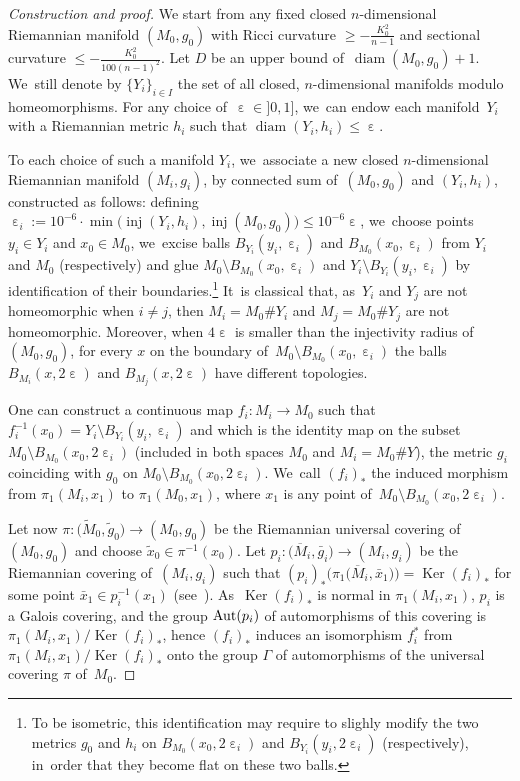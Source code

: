 \documentclass[pdftex]{sigma}
\numberwithin{equation}{section}
\newcommand{\f}{\rightarrow}
\newcommand{\Ker}{\operatorname{Ker}}
\newcommand{\diam}{\operatorname{diam}}
\newcommand{\inj}{\operatorname{inj}}
\newcommand{\e}{\operatorname{\varepsilon}}
\begin{document}
\begin{proof}[Construction and proof]
We start from any fixed closed $n$-dimensional Riemannian manifold $(M_0,
g_0)$ with Ricci curvature $\ge - \frac{K_0^2}{n-1}$ and
sectional curvature $\le - \frac{K_0^2}{100 (n-1)^2}$. Let $D$ be an upper bound of~$\diam (M_0, g_0) + 1$. We~still denote by $\{Y_i\}_{i \in I}$ the set of all closed, $n$-dimensional manifolds modulo homeomorphisms. For any choice of~$\e \in{} ]0, 1]$, we~can endow
each mani\-fold~$Y_i$ with a Riemannian metric $h_i$ such that $\diam (Y_i,
h_i) \le \e$.

To each choice of such a manifold $Y_i$, we~associate a new closed $n$-dimensional Riemannian manifold $(M_i, g_i)$, by connected sum of~$(M_0, g_0)$
and $(Y_i,h_i)$, constructed as follows: defining $\e_i := 10^{- 6}\cdot \min \big( \inj (Y_i, h_i), \inj (M_0, g_0)\big) \le 10^{- 6} \e$, we~choose points $y_i \in Y_i$ and
$x_0 \in M_0$, we~excise balls $B_{Y_i} (y_i, \e_i)$ and $B_{M_0} (x_0, \e_i)$ from $Y_i$ and $M_0$ (respectively) and glue $M_0 \setminus B_{M_0} (x_0, \e_i)$ and $Y_i \setminus B_{Y_i} (y_i, \e_i)$ by identification of their boundaries.\footnote{To be isometric, this identification may
require to slighly modify the two metrics $g_0$ and $h_i$ on $B_{M_0} (x_0, 2 \e_i)$ and $B_{Y_i} (y_i, 2 \e_i)$ (respectively), in~order that they become flat
on these two balls.} It~is classical that, as~$Y_i$ and $Y_j$ are not homeomorphic when $i\ne j$, then $M_i = M_0 \# Y_i$ and $M_j = M_0 \# Y_j$ are not homeomorphic. Moreover, when $4\e$ is smaller than the injectivity radius of~$(M_0, g_0)$, for every $x$ on the boundary of~$M_0 \setminus B_{M_0} (x_0, \e_i)$ the balls $B_{M_i} (x, 2 \e)$ and $B_{M_j} (x, 2 \e)$ have different topologies.

One can construct a continuous map $f_i \colon M_i \f M_0$ such that $f_i^{-1} (x_0) = Y_i \setminus B_{Y_i} (y_i, \e_i) $ and which is the identity map on the subset
$M_0 \setminus B_{M_0} (x_0, 2 \e_i)$ (included in both spaces $M_0$ and $M_i = M_0 \# Y$), the metric $g_i$ coinciding with $g_0$ on
$M_0 \setminus B_{M_0} (x_0, 2 \e_i)$. We~call $(f_i)_* $ the induced morphism from $\pi_1 (M_i, x_1)$ to $\pi_1 (M_0, x_1)$, where
$x_1$ is any point of~$M_0 \setminus B_{M_0} (x_0, 2 \e_i)$.

Let now $\pi \colon \big(\widetilde M_0, \tilde g_0\big) \f (M_0, g_0)$ be the Riemannian universal covering of~$(M_0, g_0)$ and choose $\tilde x_0 \in \pi^{-1} (x_0)$. Let
$ p_i \colon \big(\overline M_i, \bar g_i\big) \f (M_i, g_i)$ be the Riemannian covering of~$(M_i, g_i)$ such that $(p_i)_* \big(\pi_1 \big(\overline M_i, \bar x_1\big) \big) = \Ker (f_i)_* $ for some point $\bar x_1 \in p_i^{-1} (x_1)$ (see~\cite[Corollary~(6.9)]{GrH}). As~$\Ker (f_i)_*$ is normal in $\pi_1 (M_i, x_1)$, $p_i$ is a Galois covering, and
the group ${\rm Aut} (p_i)$ of automorphisms of this cove\-ring is $\pi_1 (M_i, x_1) / \Ker (f_i)_* $, hence $(f_i)_* $ induces an isomorphism $f_i^*$ from $\pi_1 (M_i, x_1) / \Ker (f_i)_* $ onto the group $\Gamma$ of
automorphisms of the universal covering $\pi$ of~$M_0$.


\end{proof}
\end{document}
